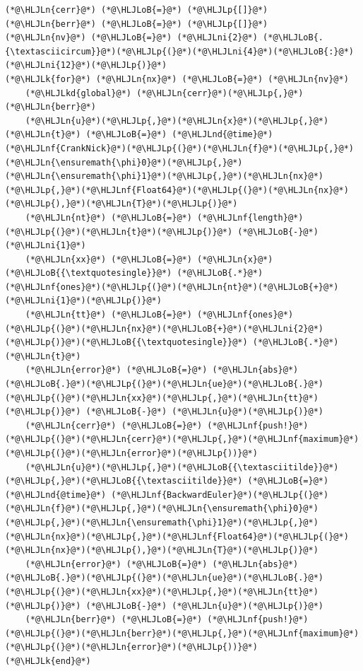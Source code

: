 \documentclass[12pt,a4paper]{article}
\newcommand{\HLJLk}[1]{\textcolor[RGB]{148,91,176}{\textbf{#1}}}
\newcommand{\HLJLkd}[1]{\textcolor[RGB]{214,102,97}{\textit{#1}}}
\newcommand{\HLJLn}[1]{#1}
\newcommand{\HLJLnd}[1]{\textcolor[RGB]{214,102,97}{#1}}
\newcommand{\HLJLnf}[1]{\textcolor[RGB]{66,102,213}{#1}}
\newcommand{\HLJLni}[1]{\textcolor[RGB]{59,151,46}{#1}}
\newcommand{\HLJLoB}[1]{\textcolor[RGB]{102,102,102}{\textbf{#1}}}
\newcommand{\HLJLp}[1]{#1}
\begin{document}
\begin{lstlisting}
(*@\HLJLn{cerr}@*) (*@\HLJLoB{=}@*) (*@\HLJLp{[]}@*)
(*@\HLJLn{berr}@*) (*@\HLJLoB{=}@*) (*@\HLJLp{[]}@*)
(*@\HLJLn{nv}@*) (*@\HLJLoB{=}@*) (*@\HLJLni{2}@*) (*@\HLJLoB{.{\textasciicircum}}@*)(*@\HLJLp{(}@*)(*@\HLJLni{4}@*)(*@\HLJLoB{:}@*)(*@\HLJLni{12}@*)(*@\HLJLp{)}@*)
(*@\HLJLk{for}@*) (*@\HLJLn{nx}@*) (*@\HLJLoB{=}@*) (*@\HLJLn{nv}@*)
    (*@\HLJLkd{global}@*) (*@\HLJLn{cerr}@*)(*@\HLJLp{,}@*) (*@\HLJLn{berr}@*)
    (*@\HLJLn{u}@*)(*@\HLJLp{,}@*)(*@\HLJLn{x}@*)(*@\HLJLp{,}@*)(*@\HLJLn{t}@*) (*@\HLJLoB{=}@*) (*@\HLJLnd{@time}@*) (*@\HLJLnf{CrankNick}@*)(*@\HLJLp{(}@*)(*@\HLJLn{f}@*)(*@\HLJLp{,}@*)(*@\HLJLn{\ensuremath{\phi}0}@*)(*@\HLJLp{,}@*)(*@\HLJLn{\ensuremath{\phi}1}@*)(*@\HLJLp{,}@*)(*@\HLJLn{nx}@*)(*@\HLJLp{,}@*)(*@\HLJLnf{Float64}@*)(*@\HLJLp{(}@*)(*@\HLJLn{nx}@*)(*@\HLJLp{),}@*)(*@\HLJLn{T}@*)(*@\HLJLp{)}@*)
    (*@\HLJLn{nt}@*) (*@\HLJLoB{=}@*) (*@\HLJLnf{length}@*)(*@\HLJLp{(}@*)(*@\HLJLn{t}@*)(*@\HLJLp{)}@*) (*@\HLJLoB{-}@*)(*@\HLJLni{1}@*)
    (*@\HLJLn{xx}@*) (*@\HLJLoB{=}@*) (*@\HLJLn{x}@*)(*@\HLJLoB{{\textquotesingle}}@*) (*@\HLJLoB{.*}@*) (*@\HLJLnf{ones}@*)(*@\HLJLp{(}@*)(*@\HLJLn{nt}@*)(*@\HLJLoB{+}@*)(*@\HLJLni{1}@*)(*@\HLJLp{)}@*)
    (*@\HLJLn{tt}@*) (*@\HLJLoB{=}@*) (*@\HLJLnf{ones}@*)(*@\HLJLp{(}@*)(*@\HLJLn{nx}@*)(*@\HLJLoB{+}@*)(*@\HLJLni{2}@*)(*@\HLJLp{)}@*)(*@\HLJLoB{{\textquotesingle}}@*) (*@\HLJLoB{.*}@*) (*@\HLJLn{t}@*)
    (*@\HLJLn{error}@*) (*@\HLJLoB{=}@*) (*@\HLJLn{abs}@*)(*@\HLJLoB{.}@*)(*@\HLJLp{(}@*)(*@\HLJLn{ue}@*)(*@\HLJLoB{.}@*)(*@\HLJLp{(}@*)(*@\HLJLn{xx}@*)(*@\HLJLp{,}@*)(*@\HLJLn{tt}@*)(*@\HLJLp{)}@*) (*@\HLJLoB{-}@*) (*@\HLJLn{u}@*)(*@\HLJLp{)}@*) 
    (*@\HLJLn{cerr}@*) (*@\HLJLoB{=}@*) (*@\HLJLnf{push!}@*)(*@\HLJLp{(}@*)(*@\HLJLn{cerr}@*)(*@\HLJLp{,}@*)(*@\HLJLnf{maximum}@*)(*@\HLJLp{(}@*)(*@\HLJLn{error}@*)(*@\HLJLp{))}@*)
    (*@\HLJLn{u}@*)(*@\HLJLp{,}@*)(*@\HLJLoB{{\textasciitilde}}@*)(*@\HLJLp{,}@*)(*@\HLJLoB{{\textasciitilde}}@*) (*@\HLJLoB{=}@*) (*@\HLJLnd{@time}@*) (*@\HLJLnf{BackwardEuler}@*)(*@\HLJLp{(}@*)(*@\HLJLn{f}@*)(*@\HLJLp{,}@*)(*@\HLJLn{\ensuremath{\phi}0}@*)(*@\HLJLp{,}@*)(*@\HLJLn{\ensuremath{\phi}1}@*)(*@\HLJLp{,}@*)(*@\HLJLn{nx}@*)(*@\HLJLp{,}@*)(*@\HLJLnf{Float64}@*)(*@\HLJLp{(}@*)(*@\HLJLn{nx}@*)(*@\HLJLp{),}@*)(*@\HLJLn{T}@*)(*@\HLJLp{)}@*)
    (*@\HLJLn{error}@*) (*@\HLJLoB{=}@*) (*@\HLJLn{abs}@*)(*@\HLJLoB{.}@*)(*@\HLJLp{(}@*)(*@\HLJLn{ue}@*)(*@\HLJLoB{.}@*)(*@\HLJLp{(}@*)(*@\HLJLn{xx}@*)(*@\HLJLp{,}@*)(*@\HLJLn{tt}@*)(*@\HLJLp{)}@*) (*@\HLJLoB{-}@*) (*@\HLJLn{u}@*)(*@\HLJLp{)}@*) 
    (*@\HLJLn{berr}@*) (*@\HLJLoB{=}@*) (*@\HLJLnf{push!}@*)(*@\HLJLp{(}@*)(*@\HLJLn{berr}@*)(*@\HLJLp{,}@*)(*@\HLJLnf{maximum}@*)(*@\HLJLp{(}@*)(*@\HLJLn{error}@*)(*@\HLJLp{))}@*)
(*@\HLJLk{end}@*)
\end{lstlisting}
\end{document}
